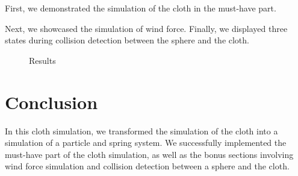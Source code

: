\documentclass[acmtog]{acmart}
\begin{document}
First, we demonstrated the simulation of the cloth in the must-have part.

Next, we showcased the simulation of wind force.
Finally, we displayed three states during collision detection between the sphere and the cloth.

\begin{figure}[H]
	\centering
	\caption{Results}
	\label{Fig.main}
\end{figure}


\section{Conclusion}

In this cloth simulation, we transformed the simulation of the cloth into a simulation of a particle and spring system. We successfully implemented the must-have part of the cloth simulation, as well as the bonus sections involving wind force simulation and collision detection between a sphere and the cloth.
\end{document}
